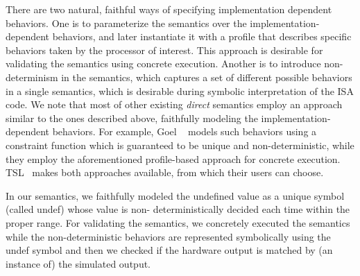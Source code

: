 There are two natural, faithful ways of specifying implementation dependent
behaviors.  One is to parameterize the semantics over the
implementation-dependent behaviors, and later instantiate it with a profile
that describes specific behaviors taken by the processor of interest. This
approach is desirable for validating the semantics using concrete execution.
Another is to introduce non-determinism in the semantics, which captures a set
of different possible behaviors in a single semantics, which is desirable
during symbolic interpretation of the ISA code.  We note that most of other
existing \emph{direct} \ISA semantics employ an approach similar to the ones
described above, faithfully modeling the implementation-dependent behaviors.
For example, Goel \etal~\cite{Goel:ProCoS17} models such behaviors using a
constraint function which is guaranteed to be unique and non-deterministic,
           while they employ the aforementioned profile-based approach for
           concrete execution.  TSL~\cite{TSL:TOPLAS13} makes both approaches
           available, from which their users can choose.

In our semantics, we faithfully modeled the undefined value as a unique symbol
(called undef) whose value is non- deterministically decided each time within
the proper range. For validating the semantics, we concretely executed the
semantics while the non-deterministic behaviors are represented symbolically
using the undef symbol and then we checked if the hardware output is matched by
(an instance of) the simulated output.

